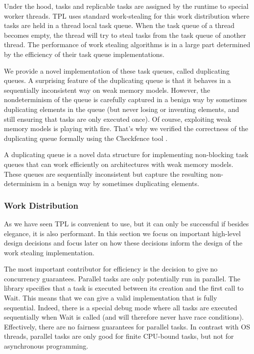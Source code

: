 Under the hood, tasks and replicable tasks are assigned by the runtime
to special worker threads. TPL uses standard work-stealing for this
work distribution \cite{Frigo1998} where tasks are held in a thread
local task queue. When the task queue of a thread becomes empty, the
thread will try to steal tasks from the task queue of another
thread. The performance of work stealing algorithms is in a large part
determined by the efficiency of their task queue implementations.

We provide a novel implementation of these task queues, called
duplicating queues. A surprising feature of the duplicating queue is
that it behaves in a sequentially inconsistent way on weak memory
models. However, the nondeterminism of the queue is carefully captured
in a benign way by sometimes duplicating elements in the queue (but
never losing or inventing elements, and still ensuring that tasks are
only executed once). Of course, exploiting weak memory models is
playing with fire. That's why we verified the correctness of the
duplicating queue formally using the Checkfence tool
\cite{Burckhardt2007, Burckhardt2007a}.

A duplicating queue is a novel data structure for implementing
non-blocking task queues that can work efficiently on architectures
with weak memory models. These queues are sequentially inconsistent
but capture the resulting non-determinism in a benign way by sometimes
duplicating elements.

\subsubsection{Work Distribution}

As we have seen TPL is convenient to use, but it can only be
successful if besides elegance, it is also performant. In this section
we focus on important high-level design decisions and focus later on
how these decisions inform the design of the work stealing
implementation.


The most important contributor for efficiency is the decision to give
no concurrency guarantees. Parallel tasks are only potentially run in
parallel. The library specifies that a task is executed between its
creation and the first call to Wait. This means that we can give a
valid implementation that is fully sequential. Indeed, there is a
special debug mode where all tasks are executed sequentially when Wait
is called (and will therefore never have race
conditions). Effectively, there are no fairness guarantees for
parallel tasks. In contrast with OS threads, parallel tasks are only
good for finite CPU-bound tasks, but not for asynchronous programming.

